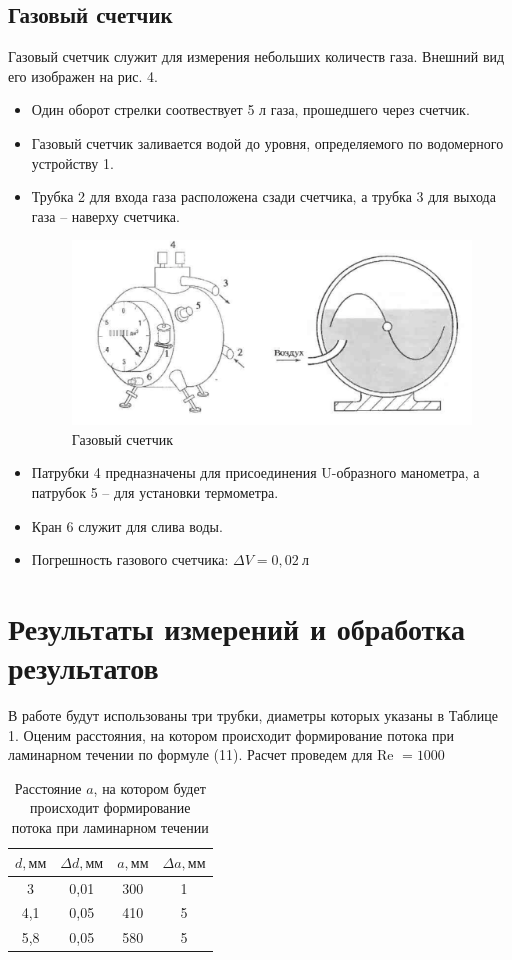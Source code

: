 \documentclass[a4paper,12pt]{article}
\theoremstyle{plain} %
\theoremstyle{definition} %
\theoremstyle{remark} %
\begin{document}
 \subsection{Газовый счетчик}
 Газовый счетчик служит для измерения небольших количеств газа. Внешний вид его изображен на рис. 4.
 \begin{itemize}
 	\item Один оборот стрелки соотвествует 5 л газа, прошедшего через счетчик.
 	\item Газовый счетчик заливается водой до уровня, определяемого по водомерного устройству 1.
 	\item Трубка 2 для входа газа расположена сзади счетчика, а трубка 3 для выхода газа -- наверху счетчика.
 

 \begin{figure}[h]
 	\begin{center}
 		\includegraphics[width=0.5\linewidth]{4}
 		\caption{Газовый счетчик}
 	\end{center}
 \end{figure}
	\item Патрубки 4 предназначены для присоединения U-образного манометра, а патрубок 5 -- для установки термометра.
\item Кран 6 служит для слива воды.
\item Погрешность газового счетчика: $\Delta V = 0,02\ \text{л}$
\end{itemize}
\section{Результаты измерений и обработка результатов}
В работе будут использованы три трубки, диаметры которых указаны в Таблице 1. Оценим расстояния, на котором происходит формирование потока при ламинарном течении по формуле (11). Расчет проведем для Re $=1000$

\begin{table}[h]
	\begin{center}
	\begin{tabular}{|c|c|c|c|}
		\hline
		$d, \text{мм}$  & $\Delta d, \text{мм}$ & $a, мм$ &$\Delta a, \text{мм}$ \\ \hline
		3   & 0,01 & 300 & 1 \\ \hline
		4,1 & 0,05 & 410 & 5 \\ \hline
		5,8 & 0,05 & 580 & 5 \\ \hline
	\end{tabular}
\caption{Расстояние $a$, на котором будет происходит формирование потока при ламинарном течении}
\end{center}
\end{table}
\end{document}
